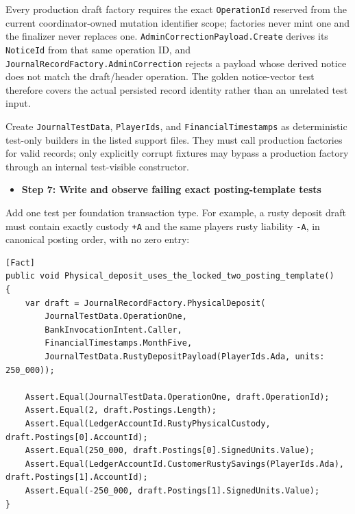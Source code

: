 \documentclass[
  10pt,
  letterpaper,
]{article}
\newcommand{\passthrough}[1]{#1}
\providecommand{\tightlist}{%
  \setlength{\itemsep}{0pt}\setlength{\parskip}{0pt}}
\begin{document}
Every production draft factory requires the exact
\passthrough{\lstinline!OperationId!} reserved from the current
coordinator-owned mutation identifier scope; factories never mint one
and the finalizer never replaces one.
\texttt{AdminCorrectionPayload.}\allowbreak{}\texttt{Create} derives its
\passthrough{\lstinline!NoticeId!} from that same operation ID, and
\texttt{JournalRecordFactory.}\allowbreak{}\texttt{AdminCorrection}
rejects a payload whose derived notice does not match the draft/header
operation. The golden notice-vector test therefore covers the actual
persisted record identity rather than an unrelated test input.

Create \passthrough{\lstinline!JournalTestData!},
\passthrough{\lstinline!PlayerIds!}, and
\passthrough{\lstinline!FinancialTimestamps!} as deterministic test-only
builders in the listed support files. They must call production
factories for valid records; only explicitly corrupt fixtures may bypass
a production factory through an internal test-visible constructor.

\begin{itemize}
\tightlist
\item[$\square$]
  \textbf{Step 7: Write and observe failing exact posting-template
  tests}
\end{itemize}

Add one test per foundation transaction type. For example, a rusty
deposit draft must contain exactly custody \passthrough{\lstinline!+A!}
and the same player\textquotesingle s rusty liability
\passthrough{\lstinline!-A!}, in canonical posting order, with no zero
entry:

\begin{lstlisting}
[Fact]
public void Physical_deposit_uses_the_locked_two_posting_template()
{
    var draft = JournalRecordFactory.PhysicalDeposit(
        JournalTestData.OperationOne,
        BankInvocationIntent.Caller,
        FinancialTimestamps.MonthFive,
        JournalTestData.RustyDepositPayload(PlayerIds.Ada, units: 250_000));

    Assert.Equal(JournalTestData.OperationOne, draft.OperationId);
    Assert.Equal(2, draft.Postings.Length);
    Assert.Equal(LedgerAccountId.RustyPhysicalCustody, draft.Postings[0].AccountId);
    Assert.Equal(250_000, draft.Postings[0].SignedUnits.Value);
    Assert.Equal(LedgerAccountId.CustomerRustySavings(PlayerIds.Ada), draft.Postings[1].AccountId);
    Assert.Equal(-250_000, draft.Postings[1].SignedUnits.Value);
}
\end{lstlisting}
\end{document}
